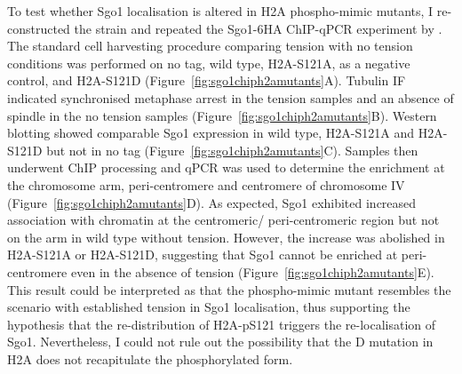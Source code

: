 To test whether Sgo1 localisation is altered in H2A phospho-mimic mutants, I re-constructed the strain and repeated the Sgo1-6HA ChIP-qPCR experiment by \cite{Nerusheva2014}. The standard cell harvesting procedure comparing tension with no tension conditions was performed on no tag, wild type, H2A-S121A, as a negative control, and H2A-S121D (Figure~\ref{fig:sgo1chiph2amutants}A). Tubulin IF indicated synchronised metaphase arrest in the tension samples and an absence of spindle in the no tension samples (Figure~\ref{fig:sgo1chiph2amutants}B). Western blotting showed comparable Sgo1 expression in wild type, H2A-S121A and H2A-S121D but not in no tag (Figure~\ref{fig:sgo1chiph2amutants}C). Samples then underwent ChIP processing and qPCR was used to determine the enrichment at the chromosome arm, peri-centromere and centromere of chromosome IV (Figure~\ref{fig:sgo1chiph2amutants}D). As expected, Sgo1 exhibited increased association with chromatin at the centromeric/ peri-centromeric region but not on the arm in wild type without tension. However, the increase was abolished in H2A-S121A or H2A-S121D, suggesting that Sgo1 cannot be enriched at peri-centromere even in the absence of tension (Figure~\ref{fig:sgo1chiph2amutants}E). This result could be interpreted as that the phospho-mimic mutant resembles the scenario with established tension in Sgo1 localisation, thus supporting the hypothesis that the re-distribution of H2A-pS121 triggers the re-localisation of Sgo1. Nevertheless, I could not rule out the possibility that the D mutation in H2A does not recapitulate the phosphorylated form. 

